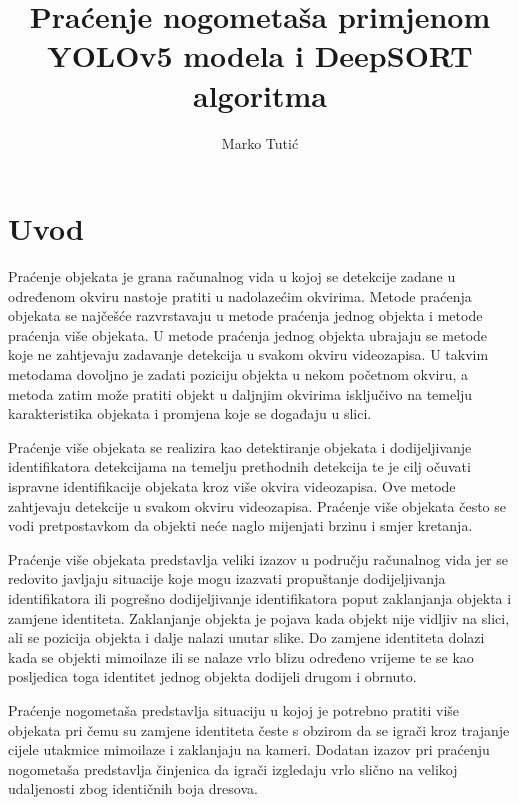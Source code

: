 \documentclass[times, utf8, seminar, numeric]{fer}
\begin{document}
\title{Praćenje nogometaša primjenom YOLOv5 modela i DeepSORT algoritma}

\author{Marko Tutić}
\maketitle

\tableofcontents

\chapter{Uvod}



Praćenje objekata je grana računalnog vida u kojoj se detekcije zadane u određenom okviru nastoje pratiti u nadolazećim okvirima.
Metode praćenja objekata se najčešće razvrstavaju u metode praćenja jednog objekta i metode praćenja više objekata. 
U metode praćenja jednog objekta ubrajaju se metode koje ne zahtjevaju zadavanje detekcija u svakom okviru videozapisa. U takvim metodama dovoljno je zadati poziciju objekta u nekom početnom okviru, a metoda zatim može pratiti objekt u daljnjim okvirima isključivo na temelju karakteristika objekata i promjena koje se događaju u slici.

Praćenje više objekata se realizira kao detektiranje objekata i dodijeljivanje identifikatora detekcijama na temelju prethodnih detekcija te je cilj očuvati ispravne identifikacije objekata kroz više okvira videozapisa. Ove metode zahtjevaju detekcije u svakom okviru videozapisa.
Praćenje više objekata često se vodi pretpostavkom da objekti neće naglo mijenjati brzinu i smjer kretanja.

Praćenje više objekata predstavlja veliki izazov u području računalnog vida jer se redovito javljaju situacije koje mogu izazvati propuštanje dodijeljivanja identifikatora ili pogrešno dodijeljivanje identifikatora poput zaklanjanja objekta i zamjene identiteta.
Zaklanjanje objekta je pojava kada objekt nije vidljiv na slici, ali se pozicija objekta i dalje nalazi unutar slike.
Do zamjene identiteta dolazi kada se objekti mimoilaze ili se nalaze vrlo blizu određeno vrijeme te se kao posljedica toga identitet jednog objekta dodijeli drugom i obrnuto. 

Praćenje nogometaša predstavlja situaciju u kojoj je potrebno pratiti više objekata pri čemu su zamjene identiteta česte s obzirom da se igrači kroz trajanje cijele utakmice mimoilaze i zaklanjaju na kameri. Dodatan izazov pri praćenju nogometaša predstavlja činjenica da igrači izgledaju vrlo slično na velikoj udaljenosti zbog identičnih boja dresova.
\end{document}
